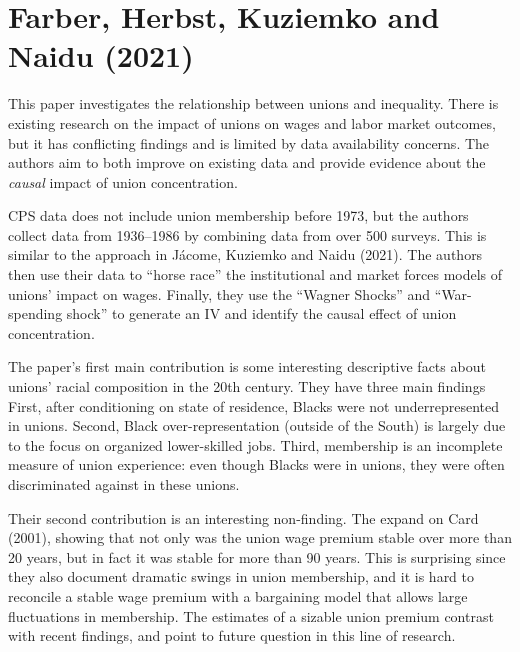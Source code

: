 \documentclass[dvipsnames]{article}
\begin{document}
\section{Farber, Herbst, Kuziemko and Naidu (2021)}
This paper investigates the relationship between unions and inequality. 
There is existing research on the impact of unions on wages and labor market outcomes, but it has conflicting findings and is limited by data availability concerns. The authors aim to both improve on existing data and provide evidence about the \emph{causal} impact of union concentration.


CPS data does not include union membership before 1973, but the authors collect data from 1936--1986 by combining data from over 500 surveys. This is similar to the approach in J\'acome, Kuziemko and Naidu (2021). The authors then use their data to ``horse race'' the institutional and market forces models of unions' impact on wages. Finally, they use the ``Wagner Shocks'' and ``War-spending shock'' to generate an IV and identify the causal effect of union concentration. 


The paper's first main contribution is some interesting descriptive facts about unions' racial composition in the 20th century. They have three main findings First, after conditioning on state of residence, Blacks were not underrepresented in unions. Second, Black over-representation (outside of the South) is largely due to the focus on organized lower-skilled jobs. Third, membership is an incomplete measure of union experience: even though Blacks were in unions, they were often discriminated against in these unions.


Their second contribution is an interesting non-finding. The expand on Card (2001), showing that not only was the union wage premium stable over more than 20 years, but in fact it was stable for more than 90 years. This is surprising since they also document dramatic swings in union membership, and it is hard to reconcile a stable wage premium with a bargaining model that allows large fluctuations in membership. The estimates of a sizable union premium contrast with recent findings, and point to future question in this line of research.
\end{document}
